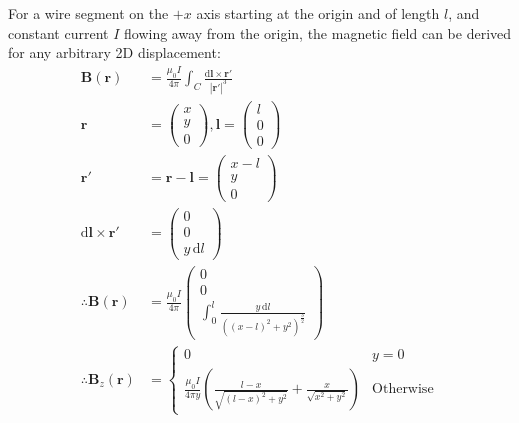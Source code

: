 \documentclass[a4paper]{scrartcl}
\begin{document}
For a wire segment on the \(+x\) axis starting at the origin and of length \(l\), and constant current \(I\) flowing away from the origin, the magnetic field can be derived for any arbitrary 2D displacement:
\begin{align*}
    \mathbf{B}(\mathbf{r}) &= \frac{\mu_0 I}{4 \pi} \int_C \frac{\mathrm{d}\mathbf{l} \times \mathbf{r}'}{|\mathbf{r}'|^3} \\
    \mathbf{r} &= \begin{pmatrix}x \\ y \\ 0\end{pmatrix}, \mathbf{l} = \begin{pmatrix}l \\ 0 \\ 0\end{pmatrix} \\
    \mathbf{r}' &= \mathbf{r} - \mathbf{l} = \begin{pmatrix}x - l \\ y \\ 0\end{pmatrix} \\
    \mathrm{d}\mathbf{l} \times \mathbf{r}' &= \begin{pmatrix}0 \\ 0 \\ y \,\mathrm{d}l\end{pmatrix} \\
    \therefore \mathbf{B}(\mathbf{r}) &= \frac{\mu_0 I}{4 \pi} \begin{pmatrix}
        0 \\ 0 \\
        \int_0^l \frac{y \,\mathrm{d}l}{((x - l)^2 + y^2)^{\frac{3}{2}}}
    \end{pmatrix} \\
    \therefore \mathbf{B}_z(\mathbf{r}) &= \begin{cases}
        0 & y = 0 \\
        \frac{\mu_0 I}{4 \pi y} \left( \frac{l - x}{\sqrt{(l - x)^2 + y^2}} + \frac{x}{\sqrt{x^2 + y^2}} \right) & \text{Otherwise}
    \end{cases}
\end{align*}
\end{document}
